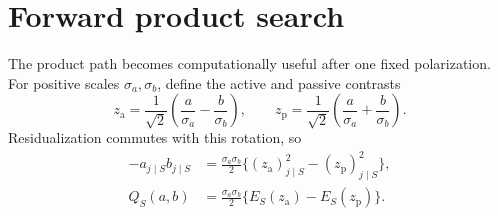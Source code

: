 \documentclass[a4paper,11pt,english]{article}
\begin{document}
\section{Forward product search}

The product path becomes computationally useful after one fixed
polarization.  For positive scales $\sigma_a,\sigma_b$, define the active
and passive contrasts
\begin{equation}\label{eq:polarization}
        z_{\mathrm a}=\frac1{\sqrt2}
        \left(\frac a{\sigma_a}-\frac b{\sigma_b}\right),
        \qquad
        z_{\mathrm p}=\frac1{\sqrt2}
        \left(\frac a{\sigma_a}+\frac b{\sigma_b}\right).
\end{equation}
Residualization commutes with this rotation, so
\begin{equation}\label{eq:polarized-product}
\begin{split}
        -a_{j\mid S}b_{j\mid S}
        &=\frac{\sigma_a\sigma_b}{2}
        \{(z_{\mathrm a})_{j\mid S}^2-(z_{\mathrm p})_{j\mid S}^2\},\\
        Q_S(a,b)
        &=\frac{\sigma_a\sigma_b}{2}
        \{E_S(z_{\mathrm a})-E_S(z_{\mathrm p})\}.
\end{split}
\end{equation}
\end{document}
